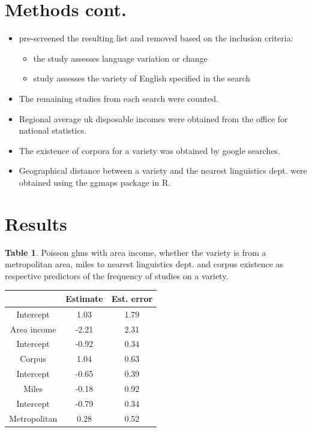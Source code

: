 \documentclass[a0paper,fleqn]{betterposter}
\begin{document}
{
	\section{Methods cont.}	
\begin{itemize}
	\item pre-screened the resulting list and removed based on the inclusion criteria:
	\begin{itemize}
		\item the study assesses language variation or change
		\item study assesses the variety of English specified in the search
	\end{itemize}
	\item The remaining studies from each search were counted.

	\item Regional average uk disposable incomes were obtained from the office for national statistics.
	\item The existence of corpora for a variety was obtained by google searches.
	\item Geographical distance between a variety and the nearest linguistics dept. were obtained using the ggmaps package in R.
\end{itemize}



\section{Results}

\vspace{1cm}
\textbf{Table 1}. Poisson glms with area income, whether the variety is from a metropolitan area, miles to nearest linguistics dept. and corpus existence as respective predictors of the frequency of studies on a variety.

\begin{tabular}{ c c c }
	 & Estimate & Est. error\\
	\hline
	 Intercept & 1.03 & 1.79	\\
	 Area income & -2.21 & 2.31\\
	\hline
	 Intercept & -0.92 & 0.34  \\
	 Corpus & 1.04 & 0.63 \\
	\hline
	 Intercept & -0.65  & 0.39  \\
	 Miles & -0.18  & 0.92  \\
	\hline
	 Intercept & -0.79 & 0.34 \\
	 Metropolitan & 0.28 & 0.52  \\
\hline
\end{tabular}



}
\end{document}
